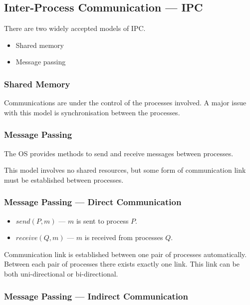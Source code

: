 \subsection{Inter-Process Communication --- IPC}

There are two widely accepted models of IPC.\@
\begin{itemize}
    \item Shared memory
    \item Message passing
\end{itemize}


\subsubsection{Shared Memory}

Communications are under the control of the processes involved.
A major issue with this model is synchronisation between the processes.


\subsubsection{Message Passing}

The OS provides methods to send and receive messages between processes.

This model involves no shared resources, but some form of communication link
must be established between processes.


\subsubsection{Message Passing --- Direct Communication}

\begin{itemize}
    \item $send(P, m)$ --- $m$ is sent to process $P$.
    \item $receive(Q, m)$ --- $m$ is received from processes $Q$.
\end{itemize}

Communication link is established between one pair of processes
automatically. Between each pair of processes there exists exactly
one link. This link can be both uni-directional or bi-directional.


\subsubsection{Message Passing --- Indirect Communication}

